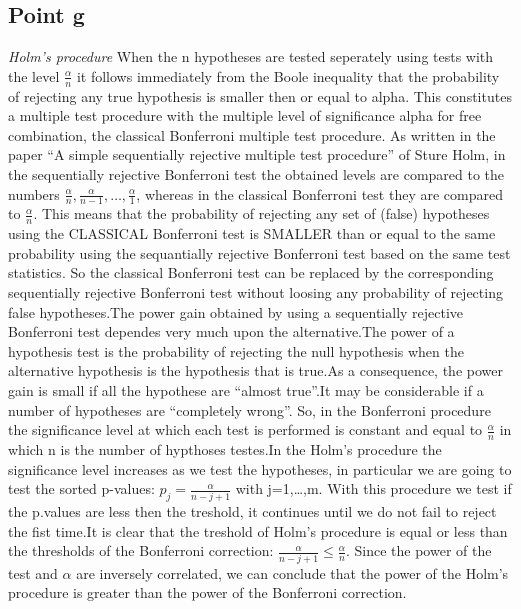 \documentclass[
]{article}
\begin{document}
\hypertarget{point-g-1}{%
\subsection{Point g}\label{point-g-1}}

\emph{Holm's procedure} When the n hypotheses are tested seperately
using tests with the level \(\frac{\alpha}{n}\) it follows immediately
from the Boole inequality that the probability of rejecting any true
hypothesis is smaller then or equal to alpha. This constitutes a
multiple test procedure with the multiple level of significance alpha
for free combination, the classical Bonferroni multiple test procedure.
As written in the paper ``A simple sequentially rejective multiple test
procedure'' of Sture Holm, in the sequentially rejective Bonferroni test
the obtained levels are compared to the numbers
\(\frac{\alpha}{n}, \frac{\alpha}{n-1}, \ldots, \frac{\alpha}{1}\),
whereas in the classical Bonferroni test they are compared to
\(\frac{\alpha}{n}\). This means that the probability of rejecting any
set of (false) hypotheses using the CLASSICAL Bonferroni test is SMALLER
than or equal to the same probability using the sequantially rejective
Bonferroni test based on the same test statistics. So the classical
Bonferroni test can be replaced by the corresponding sequentially
rejective Bonferroni test without loosing any probability of rejecting
false hypotheses.The power gain obtained by using a sequentially
rejective Bonferroni test dependes very much upon the alternative.The
power of a hypothesis test is the probability of rejecting the null
hypothesis when the alternative hypothesis is the hypothesis that is
true.As a consequence, the power gain is small if all the hypothese are
``almost true''.It may be considerable if a number of hypotheses are
``completely wrong''. So, in the Bonferroni procedure the significance
level at which each test is performed is constant and equal to
\(\frac{\alpha}{n}\) in which n is the number of hypthoses testes.In the
Holm's procedure the significance level increases as we test the
hypotheses, in particular we are going to test the sorted p-values:
\(p_j = \frac{\alpha}{{n-j+1}}\) with j=1,\ldots,m. With this procedure
we test if the p.values are less then the treshold, it continues until
we do not fail to reject the fist time.It is clear that the treshold of
Holm's procedure is equal or less than the thresholds of the Bonferroni
correction: \(\frac{\alpha}{{n-j+1}} \leq \frac{\alpha}{n}\). Since the
power of the test and \(\alpha\) are inversely correlated, we can
conclude that the power of the Holm's procedure is greater than the
power of the Bonferroni correction.
\end{document}
